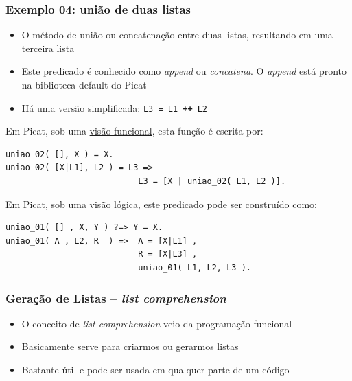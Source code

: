 \begin{frame}[fragile, allowframebreaks=0.9]
\frametitle{Exemplo 04: união de duas listas}

\begin{itemize}
  \item O método de  união ou concatenação entre duas listas,
 resultando em uma terceira lista

 \item Este predicado é conhecido como \textit{append} ou \textit{concatena}. O \textit{append} está 
pronto na  biblioteca default do Picat

\item Há uma versão simplificada: \texttt{L3 = L1 \textbf{++} L2}

\end{itemize}

Em Picat, sob uma \underline{visão funcional}, esta função é escrita por:
\begin{verbatim}
uniao_02( [], X ) = X. 
uniao_02( [X|L1], L2 ) = L3 => 
                           L3 = [X | uniao_02( L1, L2 )].
\end{verbatim}

\framebreak

Em Picat, sob uma \underline{visão lógica}, este predicado 
pode ser construído como:

\begin{verbatim}
uniao_01( [] , X, Y ) ?=> Y = X. 
uniao_01( A , L2, R  ) =>  A = [X|L1] , 
                           R = [X|L3] , 
                           uniao_01( L1, L2, L3 ).
\end{verbatim}

\end{frame}


\begin{frame}[fragile]

\frametitle{Geração de  Listas -- \textit{list comprehension}}

\begin{block}{}
\begin{itemize}
  \item O conceito de \textit{list comprehension} veio da programação funcional
  \item Basicamente serve para criarmos ou gerarmos listas
  \pause
  \item Bastante útil e pode ser usada em qualquer parte de um código
  
\end{itemize}
\end{block}

\end{frame}


